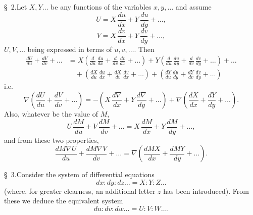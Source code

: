 \documentclass[11pt]{article}
\begin{document}
\medskip

\S~2.\quad Let $X, Y\dots$ be any functions of the variables $x, y, \dots$ and assume
\[
  U = X\,\frac{du}{dx} + Y\,\frac{du}{dy} + \dots,
\]
\[
  V = X\,\frac{dv}{dx} + Y\,\frac{dv}{dy} + \dots,
\]
$U, V, \dots$ being expressed in terms of $u, v, \dots$. Then
\begin{align*}
  \frac{dU}{du} + \frac{dV}{dv} + \dots
   &= X\!\left(\frac{d}{du}\,\frac{du}{dx} + \frac{d}{dv}\,\frac{dv}{dx} + \dots\right) + Y\!\left(\frac{d}{du}\,\frac{du}{dy} + \frac{d}{dv}\,\frac{dv}{dy} + \dots\right) + \dots \\
   &\quad + \!\left(\frac{dX}{du}\,\frac{du}{dx} + \frac{dX}{dv}\,\frac{dv}{dx} + \dots\right) + \!\left(\frac{dY}{du}\,\frac{du}{dy} + \frac{dY}{dv}\,\frac{dv}{dy} + \dots\right)
\end{align*}
i.e.
\[
  \nabla\!\left(\frac{dU}{du} + \frac{dV}{dv} + \dots\right) = -\!\left(X\,\frac{d\nabla}{dx} + Y\,\frac{d\nabla}{dy} + \dots\right) + \nabla\!\left(\frac{dX}{dx} + \frac{dY}{dy} + \dots\right).
\]
Also, whatever be the value of $M$,
\[
  U\,\frac{dM}{du} + V\,\frac{dM}{dv} + \dots = X\,\frac{dM}{dx} + Y\,\frac{dM}{dy} + \dots,
\]
and from these two properties,
\[
  \frac{dM\nabla U}{du} + \frac{dM\nabla V}{dv} + \dots = \nabla\!\left(\frac{dMX}{dx} + \frac{dMY}{dy} + \dots\right).
\]

\medskip

\S~3.\quad Consider the system of differential equations
\[
  dx : dy : dz \dots = X : Y : Z \dots
\]
(where, for greater clearness, an additional letter $z$ has been introduced). From these we deduce the equivalent system
\[
  du : dv : dw \dots = U : V : W \dots.
\]
\end{document}
